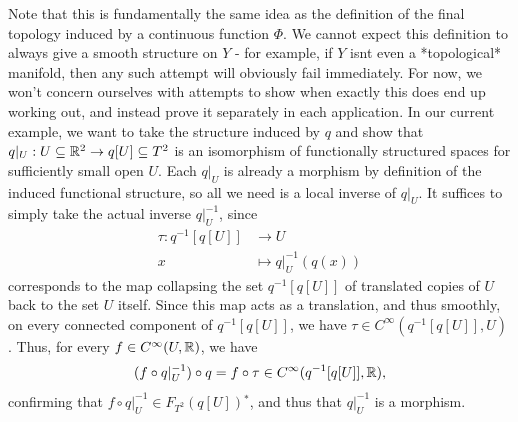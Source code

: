 Note that this is fundamentally the same idea as the definition of the final topology induced by a continuous function $\Phi$. 
\newpar
We cannot expect this definition to always give a smooth structure on $Y$ - for example, if $Y$ isnt even a *topological* manifold, then any such attempt will obviously fail immediately. For now, we won't concern ourselves with attempts to show when exactly this does end up working out, and instead prove it separately in each application.
\newpar
In our current example, we want to take the structure induced by $q$ and show that $q|_U : U \subseteq \mathbb{R}^2 \to q[U] \subseteq T^2$ is an isomorphism of functionally structured spaces for sufficiently small open $U$.
\newpar
Each $q|_U$ is already a morphism by definition of the induced functional structure, so all we need is a local inverse of $q|_U$.
\newpar
It suffices to simply take the actual inverse $q|_U^{-1}$, since
\begin{align*}
	\tau : q^{-1}[q[U]] &\to U\\
	x &\mapsto q|_U^{-1}(q(x))
\end{align*}
corresponds to the map collapsing the set $q^{-1}[q[U]]$ of translated copies of $U$ back to the set $U$ itself. Since this map acts as a translation, and thus smoothly, on every connected component of $q^{-1}[q[U]]$, we have $\tau \in C^\infty(q^{-1}[q[U]], U)$. 
\newpar
Thus, for every $f \in C^\infty(U, \mathbb{R})$, we have
\begin{align*}
	(f \circ q|_U^{-1}) \circ q = f \circ \tau \in C^\infty(q^{-1}[q[U]], \mathbb{R}),
\end{align*}
confirming that $f \circ q|_U^{-1} \in F_{T^2}(q[U])$$^*$, and thus that $q|_U^{-1}$ is a morphism.
